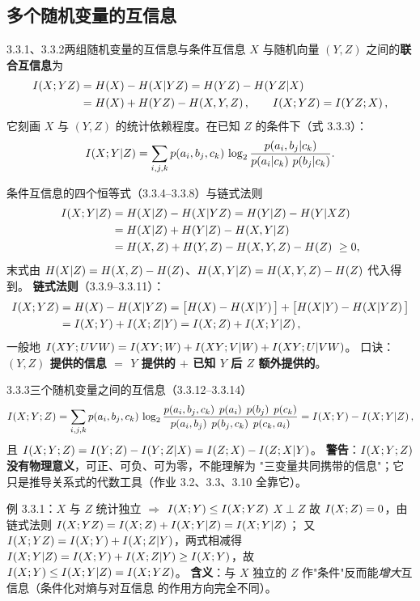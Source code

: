 \subsection{多个随机变量的互信息}

\begin{defbox}{3.3.1、3.3.2\quad 两组随机变量的互信息与条件互信息}
$X$ 与随机向量 $(Y,Z)$ 之间的\textbf{联合互信息}为
\begin{align*}
\I{X;YZ}&=\Hx{X}-\Hx{X|YZ}=\Hx{YZ}-\Hx{YZ|X}\\
&=\Hx{X}+\Hx{YZ}-\Hx{X,Y,Z},\qquad \I{X;YZ}=\I{YZ;X},
\end{align*}
它刻画 $X$ 与 $(Y,Z)$ 的统计依赖程度。在已知 $Z$ 的条件下（式 3.3.3）：
\[
I\!\left(X;Y|Z\right)=\sum_{i,j,k}p\!\left(a_i,b_j,c_k\right)\,
\log_{2}\frac{p\!\left(a_i,b_j|c_k\right)}{p\!\left(a_i|c_k\right)\,p\!\left(b_j|c_k\right)} .
\]
\end{defbox}

\begin{thmbox}{条件互信息的四个恒等式（3.3.4–3.3.8）与链式法则}
\begin{align*}
\I{X;Y|Z}
&=\Hx{X|Z}-\Hx{X|YZ}=\Hx{Y|Z}-\Hx{Y|XZ}\\
&=\Hx{X|Z}+\Hx{Y|Z}-\Hx{X,Y|Z}\\
&=\Hx{X,Z}+\Hx{Y,Z}-\Hx{X,Y,Z}-\Hx{Z}\ \ge0 ,
\end{align*}
末式由 $H\!\left(X|Z\right)=H\!\left(X,Z\right)-H\!\left(Z\right)$、$H\!\left(X,Y|Z\right)=H\!\left(X,Y,Z\right)-H\!\left(Z\right)$ 代入得到。
\textbf{链式法则}（3.3.9–3.3.11）：
\begin{align*}
\I{X;YZ}
&=\Hx{X}-\Hx{X|YZ}
=\big[\Hx{X}-\Hx{X|Y}\big]+\big[\Hx{X|Y}-\Hx{X|YZ}\big]\\
&=\I{X;Y}+\I{X;Z|Y}=\I{X;Z}+\I{X;Y|Z},
\end{align*}
一般地 $I\!\left(XY;UVW\right)=I\!\left(XY;W\right)+I\!\left(XY;V|W\right)+I\!\left(XY;U|VW\right)$。
口诀：\textbf{$(Y,Z)$ 提供的信息 $=$ $Y$ 提供的 $+$ 已知 $Y$ 后 $Z$ 额外提供的}。
\end{thmbox}

\begin{defbox}{3.3.3\quad 三个随机变量之间的互信息（3.3.12–3.3.14）}
\[
\I{X;Y;Z}=\sum_{i,j,k}\p{a_i,b_j,c_k}\,
\lb\frac{\p{a_i,b_j,c_k}\;\p{a_i}\;\p{b_j}\;\p{c_k}}
{\p{a_i,b_j}\;\p{b_j,c_k}\;\p{c_k,a_i}}
=\I{X;Y}-\I{X;Y|Z},
\]
且 $I\!\left(X;Y;Z\right)=I\!\left(Y;Z\right)-I\!\left(Y;Z|X\right)=I\!\left(Z;X\right)-I\!\left(Z;X|Y\right)$。
\textbf{警告}：$I\!\left(X;Y;Z\right)$ \textbf{没有物理意义}，可正、可负、可为零，不能理解为
"三变量共同携带的信息"；它只是推导关系式的代数工具（作业 3.2、3.3、3.10 全靠它）。
\end{defbox}

\begin{example}{例 3.3.1：$X$ 与 $Z$ 统计独立 $\Rightarrow$ $I\!\left(X;Y\right)\le I\!\left(X;YZ\right)$}
$X\perp Z$ 故 $I\!\left(X;Z\right)=0$，由链式法则 $I\!\left(X;YZ\right)=I\!\left(X;Z\right)+I\!\left(X;Y|Z\right)=I\!\left(X;Y|Z\right)$；
又 $I\!\left(X;YZ\right)=I\!\left(X;Y\right)+I\!\left(X;Z|Y\right)$，两式相减得
$I\!\left(X;Y|Z\right)=I\!\left(X;Y\right)+I\!\left(X;Z|Y\right)\ge I\!\left(X;Y\right)$，故 $I\!\left(X;Y\right)\le I\!\left(X;Y|Z\right)=I\!\left(X;YZ\right)$。
\textbf{含义}：与 $X$ 独立的 $Z$ 作"条件"反而能\emph{增大}互信息（条件化对熵与对互信息
的作用方向完全不同）。
\end{example}

